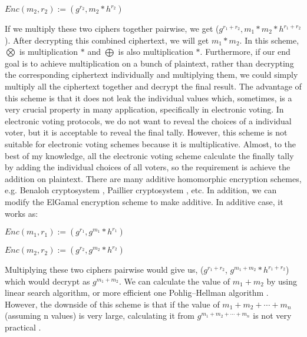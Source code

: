 	     \begin{displayquote}
	     $Enc(m_{2}, r_{2}) := (g^{r_{2}}, m_{2} *  h^{r_{2}})$ 
	      \end{displayquote}
	     
	     
	     If we multiply these two ciphers together pairwise, we get ($g^{r_{1}+ r_{2}}, m_{1} * m_{2} *  h^{r_{1} + r_{2}}$). 
	     After decrypting this combined ciphertext, we will get $m_{1} * m_{2}$. In this scheme, $\bigotimes$ is multiplication $*$ and 
	     $\bigoplus$ is also multiplication $*$.  Furthermore,  
	     if our end goal is  to achieve multiplication on a bunch of plaintext,  rather than decrypting the corresponding ciphertext individually 
	     and multiplying them, we could simply multiply all the ciphertext together and decrypt the final result.  
	     The advantage of this scheme is that it does not leak the individual values which, sometimes, is a very crucial property in many 
	     application, specifically in electronic voting.
	     In electronic voting protocols, we do not want to reveal the choices of a individual voter, but it is acceptable to reveal the final tally. 
	     However, this scheme is not suitable for electronic voting schemes because it is multiplicative. Almost, to the best of 
	     my knowledge, all the electronic voting scheme calculate the finally tally by adding the individual choices of all
	     voters, so the requirement is achieve the addition on plaintext. 
	     There are 
	     many additive homomorphic encryption schemes, e.g. Benaloh cryptosystem \citep{benaloh1994dense}, Paillier cryptosystem \citep{paillier1999public},  etc. In addition, we 
	     can modify the ElGamal encryption scheme to make additive. In additive case, it works as:
	       \begin{displayquote}
	      $Enc(m_{1}, r_{1}) := (g^{r_{1}}, g^{m_{1}} *  h^{r_{1}})$ 
	      \end{displayquote}
	     
	     \begin{displayquote}
	    $Enc(m_{2}, r_{2}) := (g^{r_{2}}, g^{m_{2}} *  h^{r_{2}})$ 
	      \end{displayquote} 
	     
	    
	     
	    
	      \noindent
	      Multiplying these two ciphers pairwise would give us,  ($g^{r_{1} + r_{2}}$, $g^{m_{1} + m_{2}} * h^{r_{1} + r_{2}}$) which would decrypt as 
	      $g^{m_{1} + m_{2}}$.  We can calculate the value 
	      of $m_{1} + m_{2}$ by using linear search algorithm, or more efficient one 
	      Pohlig–Hellman algorithm \citep{10.1109/TIT.1978.1055817}. 
	      However, the downside 
	      of this scheme is that if the value of $m_{1} + m_{2} + \dotsb + m_{n}$ (assuming n values) is very large,  calculating it from 
	      $g^{m_{1} + m_{2} + \dotsb  + m_{n}}$ is 
	      not very practical \citep{10.1007/3-540-69053-0_9}. 
	     
